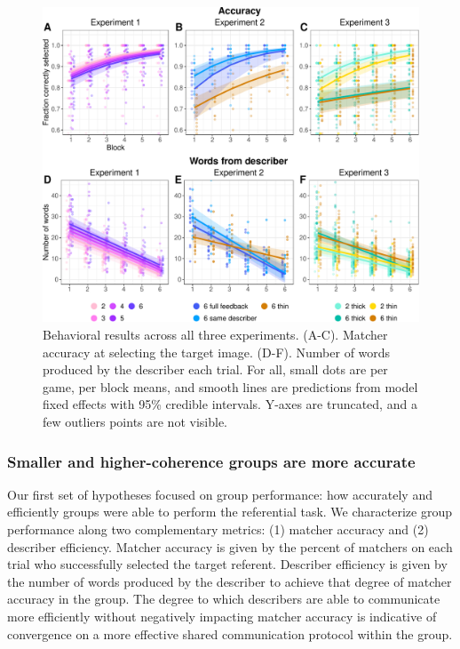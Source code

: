 \documentclass[9pt,twocolumn,twoside]{pnas-new}
\begin{document}
\begin{figure}[t!]

{\centering \includegraphics[width=1\linewidth]{behavioral-1.pdf} 

}

\caption{Behavioral results across all three experiments. (A-C). Matcher accuracy at selecting the target image. (D-F). Number of words produced by the describer each trial. For all, small dots are per game, per block means, and smooth lines are predictions from model fixed effects with 95\% credible intervals. Y-axes are truncated, and a few outliers points are not visible.}
\end{figure}

\subsubsection*{Smaller and higher-coherence groups are more
accurate}\label{smaller-and-higher-coherence-groups-are-more-accurate}

Our first set of hypotheses focused on group performance: how accurately
and efficiently groups were able to perform the referential task. We
characterize group performance along two complementary metrics: (1)
matcher accuracy and (2) describer efficiency. Matcher accuracy is given
by the percent of matchers on each trial who successfully selected the
target referent. Describer efficiency is given by the number of words
produced by the describer to achieve that degree of matcher accuracy in
the group. The degree to which describers are able to communicate more
efficiently without negatively impacting matcher accuracy is indicative
of convergence on a more effective shared communication protocol within
the group.
\end{document}
